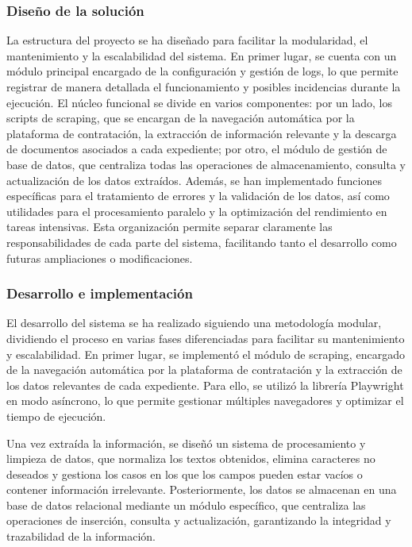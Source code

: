 \documentclass{article}
\begin{document}
\subsubsection{Diseño de la solución}
La estructura del proyecto se ha diseñado para facilitar la modularidad, el mantenimiento y la escalabilidad del sistema. En primer lugar, se cuenta con un módulo principal encargado de la configuración y gestión de logs, lo que permite registrar de manera detallada el funcionamiento y posibles incidencias durante la ejecución. El núcleo funcional se divide en varios componentes: por un lado, los scripts de scraping, que se encargan de la navegación automática por la plataforma de contratación, la extracción de información relevante y la descarga de documentos asociados a cada expediente; por otro, el módulo de gestión de base de datos, que centraliza todas las operaciones de almacenamiento, consulta y actualización de los datos extraídos. Además, se han implementado funciones específicas para el tratamiento de errores y la validación de los datos, así como utilidades para el procesamiento paralelo y la optimización del rendimiento en tareas intensivas. Esta organización permite separar claramente las responsabilidades de cada parte del sistema, facilitando tanto el desarrollo como futuras ampliaciones o modificaciones.

\subsubsection{Desarrollo e implementación}

El desarrollo del sistema se ha realizado siguiendo una metodología modular, dividiendo el proceso en varias fases diferenciadas para facilitar su mantenimiento y escalabilidad. En primer lugar, se implementó el módulo de scraping, encargado de la navegación automática por la plataforma de contratación y la extracción de los datos relevantes de cada expediente. Para ello, se utilizó la librería Playwright en modo asíncrono, lo que permite gestionar múltiples navegadores y optimizar el tiempo de ejecución.

Una vez extraída la información, se diseñó un sistema de procesamiento y limpieza de datos, que normaliza los textos obtenidos, elimina caracteres no deseados y gestiona los casos en los que los campos pueden estar vacíos o contener información irrelevante. Posteriormente, los datos se almacenan en una base de datos relacional mediante un módulo específico, que centraliza las operaciones de inserción, consulta y actualización, garantizando la integridad y trazabilidad de la información.
\end{document}
